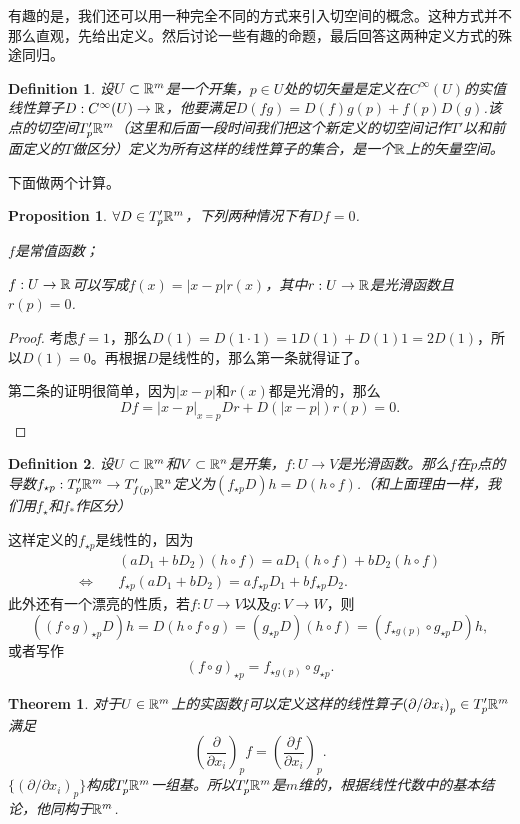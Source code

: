 \documentclass[11pt]{extbook}
\theoremstyle{plain}%
\newtheorem{pro}{Proposition}[section]%
\newtheorem{theo}{Theorem}[section]%
\newtheorem{defi}{Definition}[section]%
\begin{document}
有趣的是，我们还可以用一种完全不同的方式来引入切空间的概念。这种方式并不那么直观，先给出定义。然后讨论一些有趣的命题，最后回答这两种定义方式的殊途同归。
\begin{defi}
	设$U \subset \mathbb{R}^m$是一个开集，$p\in U$处的切矢量是定义在$C^\infty(U)$的实值线性算子$D:C^\infty(U)\to \mathbb{R}$，他要满足$D(fg)=D(f)g(p)+f(p)D(g)$.该点的切空间$T'_p\mathbb{R}^m$（这里和后面一段时间我们把这个新定义的切空间记作$T'$以和前面定义的$T$做区分）定义为所有这样的线性算子的集合，是一个$\mathbb{R}$上的矢量空间。
\end{defi}
下面做两个计算。
\begin{pro}
$\forall D \in T'_p\mathbb{R}^m$，下列两种情况下有$Df=0$.

$f$是常值函数；

$f:U \to \mathbb{R}$可以写成$f(x)=|x-p|r(x)$，其中$r:U\to \mathbb{R}$是光滑函数且$r(p)=0$.
\end{pro}
\begin{proof}
	考虑$f=1$，那么$D(1)=D(1\cdot1)=1D(1)+D(1)1=2D(1)$，所以$D(1)=0$。再根据$D$是线性的，那么第一条就得证了。

	第二条的证明很简单，因为$|x-p|$和$r(x)$都是光滑的，那么
	\[
		Df=|x-p|_{x=p}Dr+D(|x-p|)r(p)=0.
	\]
\end{proof}
\begin{defi}
	设$U \subset \mathbb{R}^m$和$V \subset \mathbb{R}^n$是开集，$f:U\to V$是光滑函数。那么$f$在$p$点的导数$f_{\star p}:T'_p\mathbb{R}^m \to T'_{f(p)}\mathbb{R}^n$定义为$(f_{\star p}D)h=D(h\circ f)$.（和上面理由一样，我们用$f_\star$和$f_*$作区分）
\end{defi}
这样定义的$f_{\star p}$是线性的，因为
\[
	\begin{split}
		&(aD_1+bD_2)(h\circ f)=aD_1(h\circ f)+bD_2(h\circ f)\\
		\Leftrightarrow\quad &f_{\star p}(aD_1+bD_2)=af_{\star p}D_1+bf_{\star p}D_2.
	\end{split}
\]
此外还有一个漂亮的性质，若$f:U\to V$以及$g:V\to W$，则
\[
	\left((f\circ g)_{\star p}D\right)h=D(h\circ f\circ g)=(g_{\star p}D)(h\circ f)=\left(f_{\star g(p)}\circ g_{\star p}D\right)h,
\]
或者写作
\[
	(f\circ g)_{\star p}=f_{\star g(p)}\circ g_{\star p}.
\]
\begin{theo}
	对于$U\in \mathbb{R}^m$上的实函数$f$可以定义这样的线性算子$\left(\partial/\partial x_i\right)_p\in T'_p\mathbb{R}^m$满足
	\[
		\left(\frac{\partial}{\partial x_i}\right)_p f=\left(\frac{\partial f}{\partial x_i}\right)_p.
	\]
	$\{\left(\partial/\partial x_i\right)_p\}$构成$T'_p\mathbb{R}^m$一组基。所以$T'_p\mathbb{R}^m$是$m$维的，根据线性代数中的基本结论，他同构于$\mathbb{R}^m$.
\end{theo}
\end{document}
